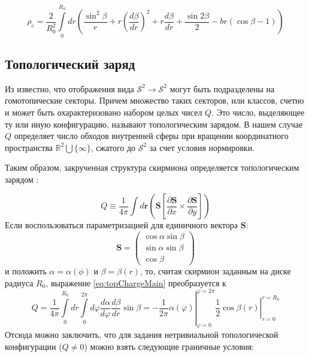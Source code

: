 \documentclass[a4paper,article,14pt]{extarticle}
\begin{document}
\begin{equation}
\label{eq:density}
{\rho _c} = \frac{2}{{R_0^2}}\int\limits_0^{{R_0}} {dr\left( {\frac{{{{\sin }^2}\beta }}{r} + r{{\left( {\frac{{d\beta }}{{dr}}} \right)}^2} + r\frac{{d\beta }}{{dr}} + \frac{{\sin 2\beta }}{2} - br\left( {\cos \beta  - 1} \right)} \right)}
\end{equation}

\subsection{Топологический заряд}

Из \cite{rajaraman} известно, что отображения вида $\mathcal{S}^2 \rightarrow \mathcal{S}^2$ могут быть подразделены на гомотопические секторы. Причем множество таких секторов, или классов, счетно и может быть охарактеризовано набором целых чисел $Q$. Это число, выделяющее ту или иную конфигурацию, называют топологическим зарядом. В нашем случае $Q$ определяет число обходов внутренней сферы при вращении координатного пространства $\mathbb{R}^2 \bigcup \{\infty\}$, сжатого до $\mathcal{S}^2$ за счет условия нормировки.

Таким образом, закрученная структура скирмиона определяется топологическим зарядом \cite{rajaraman}:

\begin{equation}
\label{eq:topChargeMain}
Q \equiv \frac{1}{{4\pi }}\int {d{\mathbf{r}}\left( {{\mathbf{S}}\left[ {\frac{{\partial {\mathbf{S}}}}{{\partial x}} \times \frac{{\partial {\mathbf{S}}}}{{\partial y}}} \right]} \right)}
\end{equation}
Если воспользоваться параметризацией для единичного вектора $\mathbf{S}$:
\begin{equation}
\label{eq:parametr}
\mathbf{S} = \left( {\begin{array}{*{20}{c}}
{\cos \alpha \sin \beta }\\
{\sin \alpha \sin \beta }\\
{\cos \beta }
\end{array}} \right)
\end{equation}
и положить $\alpha = \alpha(\phi)$ и $\beta = \beta (r)$, то, считая скирмион заданным на диске радиуса $R_0$,  выражение \eqref{eq:topChargeMain} преобразуется к
\begin{equation}
\label{eq:topChargeSimplify}
\left. {Q = \frac{1}{{4\pi }}\int\limits_0^{{R_0}} {dr\int\limits_0^{2\pi } {d\varphi } } \frac{{d\alpha }}{{d\varphi }}\frac{{d\beta }}{{dr}}\sin \beta  =  - \frac{1}{{2\pi }}\alpha \left( \varphi  \right)} \right|_{\varphi  = 0}^{\varphi  = 2\pi }\left. {\frac{1}{2}\cos \beta \left( r \right)} \right|_{r = 0}^{r = {R_0}}
\end{equation}
Отсюда можно заключить, что для задания нетривиальной топологической конфигурации ($Q \neq0$) можно взять следующие граничные условия:
\end{document}
